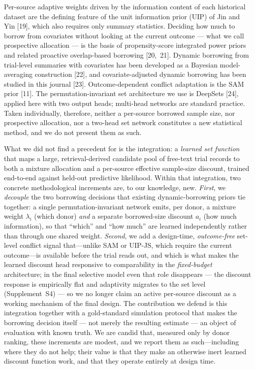 \documentclass[11pt]{article}
\begin{document}
Per-source adaptive weights driven by the information content of each
historical dataset are the defining feature of the unit information prior (UIP)
of Jin and Yin [19], which also requires only summary statistics. Deciding how
much to borrow from covariates without looking at the current outcome --- what
we call prospective allocation --- is the basis of propensity-score integrated
power priors and related proactive overlap-based borrowing [20,~21]. Dynamic
borrowing from trial-level summaries with covariates has been developed as a
Bayesian model-averaging construction [22], and covariate-adjusted dynamic
borrowing has been studied in this journal [23]. Outcome-dependent conflict
adaptation is the SAM prior [11]. The permutation-invariant set architecture we
use is DeepSets [24], applied here with two output heads; multi-head networks
are standard practice. Taken individually, therefore, neither a per-source
borrowed sample size, nor prospective allocation, nor a two-head set network
constitutes a new statistical method, and we do not present them as such.

What we did not find a precedent for is the integration: a \emph{learned set
function} that maps a large, retrieval-derived candidate pool of free-text
trial records to both a mixture allocation and a per-source effective
sample-size discount, trained end-to-end against held-out predictive
likelihood. Within that integration, two concrete methodological increments are,
to our knowledge, new. \emph{First}, we \emph{decouple} the two borrowing
decisions that existing dynamic-borrowing priors tie together: a single
permutation-invariant network emits, per donor, a mixture weight $\lambda_i$
(which donor) \emph{and} a separate borrowed-size discount $a_i$ (how
much information), so that ``which'' and ``how much'' are learned independently
rather than through one shared weight. \emph{Second}, we add a design-time,
\emph{outcome-free} set-level conflict signal that---unlike SAM or UIP-JS, which
require the current outcome---is available before the trial reads out, and which
is what makes the learned discount head responsive to comparability in the
\emph{fixed-budget} architecture; in the final selective model even that
role disappears --- the discount response is empirically flat and
adaptivity migrates to the set level (Supplement~S4) --- so we no longer
claim an active per-source discount as a working mechanism of the final
design. The contribution we defend is this integration together with a
gold-standard simulation protocol that makes the borrowing decision itself ---
not merely the resulting estimate --- an object of evaluation with known truth.
We are candid that, measured only by donor ranking, these increments are modest,
and we report them as such---including where they do not help; their value is
that they make an otherwise inert learned discount function work, and that they
operate entirely at design time.
\end{document}

